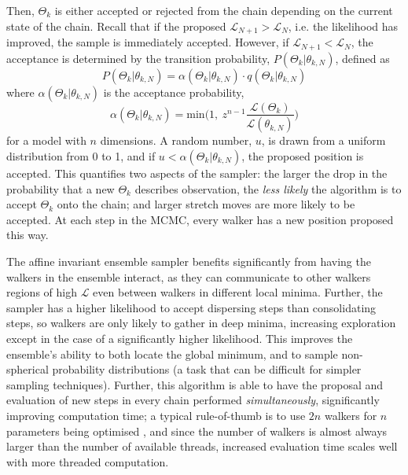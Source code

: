 Then, $\Theta_k$ is either accepted or rejected from the chain depending on the current state of the chain. Recall that if the proposed $\mathcal{L}_{N+1} > \mathcal{L}_{N}$, i.e. the likelihood has improved, the sample is immediately accepted. However, if $\mathcal{L}_{N+1} < \mathcal{L}_{N}$, the acceptance is determined by the transition probability, $P(\Theta_k | \theta_{k,N})$, defined as
\begin{equation}
    P(\Theta_k | \theta_{k,N}) = \alpha(\Theta_k | \theta_{k,N}) \cdot q(\Theta_k | \theta_{k,N})
\end{equation}
where $\alpha(\Theta_k | \theta_{k,N})$ is the acceptance probability,
\begin{equation}
    \alpha(\Theta_k | \theta_{k,N}) = \mathrm{min}\bigg( 1,\ z^{n-1}\frac{\mathcal{L}(\Theta_k)}{\mathcal{L}(\theta_{k,N})} \bigg)
\end{equation}
for a model with $n$ dimensions.
A random number, $u$, is drawn from a uniform distribution from 0 to 1, and if $u < \alpha(\Theta_k | \theta_{k,N})$, the proposed position is accepted.
This quantifies two aspects of the sampler: the larger the drop in the probability that a new $\Theta_k$ describes observation, the \textit{less likely} the algorithm is to accept $\Theta_k$ onto the chain; and larger stretch moves are more likely to be accepted.
At each step in the MCMC, every walker has a new position proposed this way.

The affine invariant ensemble sampler benefits significantly from having the walkers in the ensemble interact, as they can communicate to other walkers regions of high $\mathcal{L}$ even between walkers in different local minima. Further, the sampler has a higher likelihood to accept dispersing steps than consolidating steps, so walkers are only likely to gather in deep minima, increasing exploration except in the case of a significantly higher likelihood.
This improves the ensemble's ability to both locate the global minimum, and to sample non-spherical probability distributions (a task that can be difficult for simpler sampling techniques).
Further, this algorithm is able to have the proposal and evaluation of new steps in every chain performed \textit{simultaneously}, significantly improving computation time;
a typical rule-of-thumb is to use $2n$ walkers for $n$ parameters being optimised \citet{goodman2010}, and since the number of walkers is almost always larger than the number of available threads, increased evaluation time scales well with more threaded computation.


